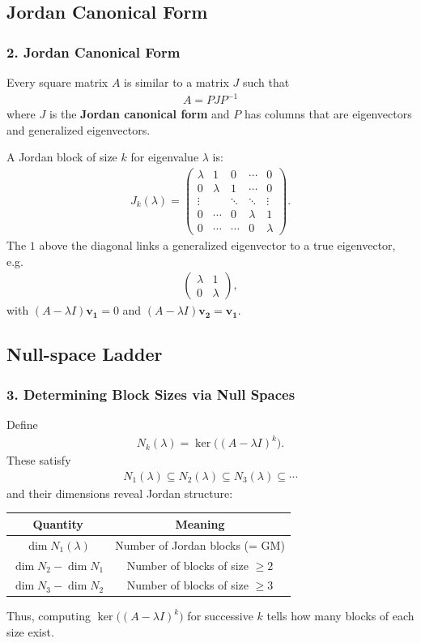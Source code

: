 \documentclass{beamer}
\newcommand{\myvec}[1]{\ensuremath{\begin{pmatrix}#1\end{pmatrix}}}
\let\vec\mathbf
\numberwithin{equation}{section}
\begin{document}
\subsection{Jordan Canonical Form}
\begin{frame}
\frametitle{2. Jordan Canonical Form}
Every square matrix $A$ is similar to a matrix $J$ such that
\begin{align}
A = PJP^{-1}
\end{align}
where $J$ is the \textbf{Jordan canonical form} and $P$ has columns that are eigenvectors and generalized eigenvectors.

A Jordan block of size $k$ for eigenvalue $\lambda$ is:
\begin{align}
J_k(\lambda) =
\myvec{
\lambda & 1 & 0 & \cdots & 0\\
0 & \lambda & 1 & \cdots & 0\\
\vdots & & \ddots & \ddots & \vdots\\
0 & \cdots & 0 & \lambda & 1\\
0 & \cdots & \cdots & 0 & \lambda
}.
\end{align}
The $1$ above the diagonal links a generalized eigenvector to a true eigenvector, e.g.
\begin{align}
\myvec{\lambda & 1\\0 & \lambda},
\end{align}
with $(A-\lambda I)\vec{v_1}=0$ and $(A-\lambda I)\vec{v_2}=\vec{v_1}$.
\end{frame}

\subsection{Null-space Ladder}
\begin{frame}
\frametitle{3. Determining Block Sizes via Null Spaces}
Define
\begin{align}
N_k(\lambda)=\ker\!\big((A-\lambda I)^k\big).
\end{align}
These satisfy
\begin{align}
N_1(\lambda)\subseteq N_2(\lambda)\subseteq N_3(\lambda)\subseteq\cdots
\end{align}
and their dimensions reveal Jordan structure:

\begin{table}[H]\centering
\renewcommand{\arraystretch}{1.3}
\begin{tabular}{|c|c|}
\hline
\textbf{Quantity} & \textbf{Meaning} \\ \hline
$\dim N_1(\lambda)$ & Number of Jordan blocks (= GM) \\ \hline
$\dim N_2-\dim N_1$ & Number of blocks of size $\ge2$ \\ \hline
$\dim N_3-\dim N_2$ & Number of blocks of size $\ge3$ \\ \hline
\end{tabular}
\end{table}
Thus, computing $\ker\big((A-\lambda I)^k\big)$ for successive $k$ tells how many blocks of each size exist.
\end{frame}
\end{document}
